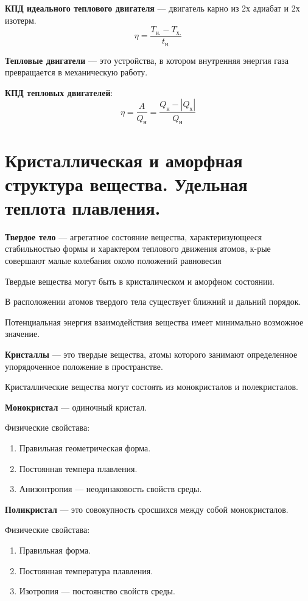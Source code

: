 \documentclass{report}
\begin{document}
{\bf КПД идеального теплового двигателя} ---
двигатель карно из 2х адиабат и 2х изотерм.
$$
\eta = \frac{T_\textrm{н.}-T_\textrm{х.}}{t_\textrm{н.}}
$$

{\bf Тепловые двигатели} ---
это устройства, в котором внутренняя энергия газа превращается в механическую работу.

{\bf КПД тепловых двигателей}:
$$
\eta = \frac{A}{Q_\textrm{н}}=\frac{Q_\textrm{н}-\left|Q_\textrm{х}\right|}{Q_\textrm{н}}
$$



\part{Кристаллическая и аморфная структура вещества. 
Удельная теплота плавления.}

{\bf Твердое тело} ---
агрегатное состояние вещества, характеризующееся стабильностью формы и характером 
теплового движения атомов, к-рые совершают малые колебания около положений равновесия

Твердые вещества могут быть в кристалическом и аморфном состоянии.

В расположении атомов твердого тела существует ближний и дальний порядок.

Потенциальная энергия взаимодействия вещества имеет минимально возможное значение.

{\bf Кристаллы} ---
это твердые вещества, атомы которого занимают определенное упорядоченное положение в пространстве.

Кристаллические вещества могут состоять из монокристалов и полекристалов.

{\bf Монокристал} ---
одиночный кристал.

Физические свойстава:
\begin{enumerate}
  \item Правильная геометрическая форма.
  \item Постоянная темпера плавления.
  \item Анизонтропия --- неодинаковость свойств среды. 
\end{enumerate}

{\bf Поликристал} ---
это совокупность сросшихся между собой монокристалов.

Физические свойстава:
\begin{enumerate}
  \item Правильная форма.
  \item Постоянная температура плавления.
  \item Изотропия --- постоянство свойств среды.
\end{enumerate}
\end{document}
